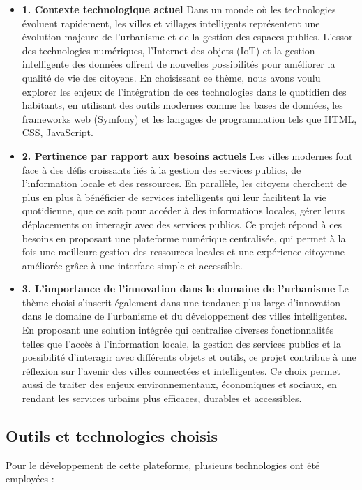 \documentclass[a4paper,12pt]{report}
\begin{document}
	\begin{itemize}
		\item \textbf{1. Contexte technologique actuel} Dans un monde où les technologies évoluent rapidement, les villes et villages intelligents représentent une évolution majeure de l'urbanisme et de la gestion des espaces publics. L'essor des technologies numériques, l'Internet des objets (IoT) et la gestion intelligente des données offrent de nouvelles possibilités pour améliorer la qualité de vie des citoyens. En choisissant ce thème, nous avons voulu explorer les enjeux de l'intégration de ces technologies dans le quotidien des habitants, en utilisant des outils modernes comme les bases de données, les frameworks web (Symfony) et les langages de programmation tels que HTML, CSS, JavaScript.
		\item \textbf{2. Pertinence par rapport aux besoins actuels} Les villes modernes font face à des défis croissants liés à la gestion des services publics, de l'information locale et des ressources. En parallèle, les citoyens cherchent de plus en plus à bénéficier de services intelligents qui leur facilitent la vie quotidienne, que ce soit pour accéder à des informations locales, gérer leurs déplacements ou interagir avec des services publics. Ce projet répond à ces besoins en proposant une plateforme numérique centralisée, qui permet à la fois une meilleure gestion des ressources locales et une expérience citoyenne améliorée grâce à une interface simple et accessible.
		\item \textbf{3. L'importance de l'innovation dans le domaine de l'urbanisme} 	Le thème choisi s'inscrit également dans une tendance plus large d'innovation dans le domaine de l'urbanisme et du développement des villes intelligentes. En proposant une solution intégrée qui centralise diverses fonctionnalités telles que l'accès à l'information locale, la gestion des services publics et la possibilité d'interagir avec différents objets et outils, ce projet contribue à une réflexion sur l'avenir des villes connectées et intelligentes. Ce choix permet aussi de traiter des enjeux environnementaux, économiques et sociaux, en rendant les services urbains plus efficaces, durables et accessibles.
	\end{itemize}	
	
	\subsection{Outils et technologies choisis}
	
	Pour le développement de cette plateforme, plusieurs technologies ont été employées :
	
\end{document}

